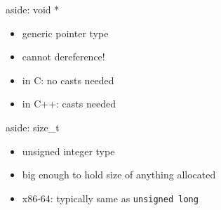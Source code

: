 \begin{frame}{aside: void *}
\begin{itemize}
    \item generic pointer type
    \item cannot dereference!
    \item in C: no casts needed 
    \item in C++: casts needed
\end{itemize}
\end{frame}

\begin{frame}{aside: size\_t}
\begin{itemize}
    \item unsigned integer type
    \item big enough to hold size of anything allocated
    \item x86-64: typically same as \texttt{unsigned long}
\end{itemize}
\end{frame}
